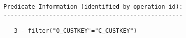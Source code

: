 \documentclass[11pt,a4paper,parskip=half]{scrartcl}
\begin{document}
\begin{lstlisting}
Predicate Information (identified by operation id):                                                                                                                                                                                                                                                          
---------------------------------------------------                                                                                                                                                                                                                                                          
                                                                                                                                                                                                                                                                                                             
   3 - filter("O_CUSTKEY"="C_CUSTKEY")                                                                                                                                                                                                                                                                       
\end{lstlisting}
\end{document}
